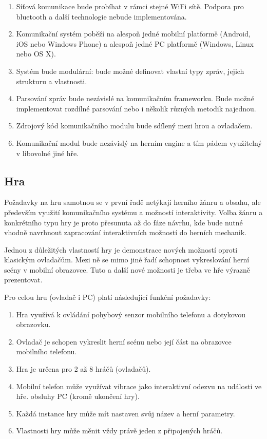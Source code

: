 \documentclass[thesis=B,czech,hidelinks]{FITthesis}[2012/06/26] %
\begin{document}
\begin{enumerate}
	\item Síťová komunikace bude probíhat v rámci stejné WiFi sítě. Podpora pro bluetooth a další technologie nebude implementována.
	\item Komunikační systém poběží na alespoň jedné mobilní platformě (Android, iOS nebo Windows Phone) a alespoň jedné PC platformě (Windows, Linux nebo OS X).
	\item Systém bude modulární: bude možné definovat vlastní typy zpráv, jejich strukturu a vlastnosti.
	\item Parsování zpráv bude nezávislé na komunikačním frameworku. Bude možné implementovat rozdílné parsování nebo i několik různých metodik najednou.
	\item Zdrojový kód komunikačního modulu bude sdílený mezi hrou a ovladačem.
	\item Komunikační modul bude nezávislý na herním engine a tím pádem využitelný v libovolné jiné hře.
\end{enumerate}

\subsection{Hra}

Požadavky na hru samotnou se v první řadě netýkají herního žánru a obsahu, ale především využití komunikačního systému a možností interaktivity. Volba žánru a konkrétního typu hry je proto přesunuta až do fáze návrhu, kde bude nutné vhodně navrhnout zapracování interaktivních možností do herních mechanik.

Jednou z důležitých vlastností hry je demonstrace nových možností oproti klasickým ovladačům. Mezi ně se mimo jiné řadí schopnost vykreslování herní scény v mobilní obrazovce. Tuto a další nové možnosti je třeba ve hře výrazně prezentovat.

Pro celou hru (ovladač i PC) platí následující funkční požadavky:

\begin{enumerate}
	\item Hra využívá k ovládání pohybový senzor mobilního telefonu a dotykovou obrazovku.
	\item Ovladač je schopen vykreslit herní scénu nebo její část na obrazovce mobilního telefonu.
	\item Hra je určena pro 2 až 8 hráčů (ovladačů).
	\item Mobilní telefon může využívat vibrace jako interaktivní odezvu na události ve hře.
 obsluhy PC (kromě ukončení hry).
 	\item Každá instance hry může mít nastaven svůj název a herní parametry.
	\item Vlastnosti hry může měnit vždy právě jeden z připojených hráčů.
\end{enumerate}
\end{document}
